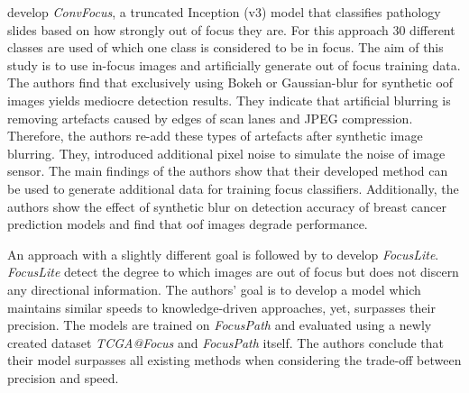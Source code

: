 \textcite{kohlberger2019wholeslide} develop \emph{ConvFocus}, a truncated Inception (v3) model that classifies pathology slides based on how strongly out of focus they are. For this approach 30 different classes are used of which one class is considered to be in focus. The aim of this study is to use in-focus images and artificially generate out of focus training data.
The authors find that exclusively using Bokeh or Gaussian-blur for synthetic \ac{oof} images yields mediocre detection results. They indicate that artificial blurring is removing artefacts caused by edges of scan lanes and JPEG compression. Therefore, the authors re-add these types of artefacts after synthetic image blurring. They, introduced additional pixel noise to simulate the noise of image sensor.
The main findings of the authors show that their developed method can be used to generate additional data for training focus classifiers. Additionally, the authors show the effect of synthetic blur on detection accuracy of breast cancer prediction models and find that \ac{oof} images degrade performance.

An approach with a slightly different goal is followed by \textcite{wang2020focuslitenn} to develop \emph{FocusLite}. \emph{FocusLite} detect the degree to which images are out of focus but does not discern any directional information. The authors' goal is to develop a model which maintains similar speeds to knowledge-driven approaches, yet, surpasses their precision. The models are trained on \emph{FocusPath} \cite{hosseini2019encoding} and evaluated using a newly created dataset \emph{TCGA@Focus} and \emph{FocusPath} itself.
The authors conclude that their model surpasses all existing methods when considering the trade-off between precision and speed.  
